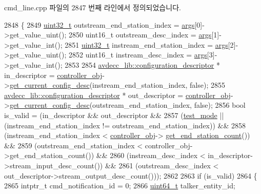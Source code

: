 cmd\+\_\+line.\+cpp 파일의 2847 번째 라인에서 정의되었습니다.


\begin{DoxyCode}
2848 \{
2849     \hyperlink{parse_8c_a6eb1e68cc391dd753bc8ce896dbb8315}{uint32\_t} outstream\_end\_station\_index = \hyperlink{namespaceastime__fitline_a8187411843a6284ffb964ef3fb9fcab3}{args}[0]->get\_value\_uint();
2850     uint16\_t outstream\_desc\_index = \hyperlink{namespaceastime__fitline_a8187411843a6284ffb964ef3fb9fcab3}{args}[1]->get\_value\_int();
2851     \hyperlink{parse_8c_a6eb1e68cc391dd753bc8ce896dbb8315}{uint32\_t} instream\_end\_station\_index = \hyperlink{namespaceastime__fitline_a8187411843a6284ffb964ef3fb9fcab3}{args}[2]->get\_value\_uint();
2852     uint16\_t instream\_desc\_index = \hyperlink{namespaceastime__fitline_a8187411843a6284ffb964ef3fb9fcab3}{args}[3]->get\_value\_int();
2853 
2854     \hyperlink{classavdecc__lib_1_1configuration__descriptor}{avdecc\_lib::configuration\_descriptor} * in\_descriptor = 
      \hyperlink{classcmd__line_af0a7784509e5bf1210a2aa19cea5df70}{controller\_obj}->\hyperlink{classavdecc__lib_1_1controller_af249ed146464b54d7fc9d87f67bcff46}{get\_current\_config\_desc}(instream\_end\_station\_index, \textcolor{keyword}{
      false});
2855     \hyperlink{classavdecc__lib_1_1configuration__descriptor}{avdecc\_lib::configuration\_descriptor} * out\_descriptor = 
      \hyperlink{classcmd__line_af0a7784509e5bf1210a2aa19cea5df70}{controller\_obj}->\hyperlink{classavdecc__lib_1_1controller_af249ed146464b54d7fc9d87f67bcff46}{get\_current\_config\_desc}(outstream\_end\_station\_index, \textcolor{keyword}{
      false});
2856     \textcolor{keywordtype}{bool} is\_valid = (in\_descriptor && out\_descriptor &&
2857                      (\hyperlink{classcmd__line_a07c66893ce868671f9998dad80094cb1}{test\_mode} || (instream\_end\_station\_index != outstream\_end\_station\_index)) &&
2858                      (instream\_end\_station\_index < \hyperlink{classcmd__line_af0a7784509e5bf1210a2aa19cea5df70}{controller\_obj}->
      \hyperlink{classavdecc__lib_1_1controller_ab5ddf7b4a9718fe3e821289141f44485}{get\_end\_station\_count}()) &&
2859                      (outstream\_end\_station\_index < controller\_obj->get\_end\_station\_count()) &&
2860                      (instream\_desc\_index < in\_descriptor->stream\_input\_desc\_count()) &&
2861                      (outstream\_desc\_index < out\_descriptor->stream\_output\_desc\_count()));
2862 
2863     \textcolor{keywordflow}{if} (is\_valid)
2864     \{
2865         intptr\_t cmd\_notification\_id = 0;
2866         \hyperlink{parse_8c_aec6fcb673ff035718c238c8c9d544c47}{uint64\_t} talker\_entity\_id;

\end{DoxyCode}
